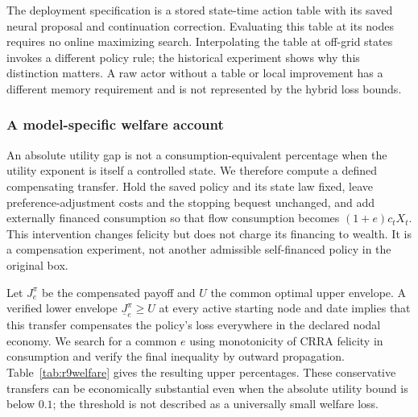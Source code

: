 \documentclass[ecta,nameyear,draft]{econsocart}
\theoremstyle{definition}
\theoremstyle{remark}
\begin{document}
The deployment specification is a stored state-time action table with its saved neural proposal and continuation correction. Evaluating this table at its nodes requires no online maximizing search. Interpolating the table at off-grid states invokes a different policy rule; the historical experiment shows why this distinction matters. A raw actor without a table or local improvement has a different memory requirement and is not represented by the hybrid loss bounds.

\subsubsection{A model-specific welfare account}
An absolute utility gap is not a consumption-equivalent percentage when the utility exponent is itself a controlled state. We therefore compute a defined compensating transfer. Hold the saved policy and its state law fixed, leave preference-adjustment costs and the stopping bequest unchanged, and add externally financed consumption so that flow consumption becomes $(1+e)c_tX_t$. This intervention changes felicity but does not charge its financing to wealth. It is a compensation experiment, not another admissible self-financed policy in the original box.

Let $J_e^\pi$ be the compensated payoff and $U$ the common optimal upper envelope. A verified lower envelope $\underline J_e^\pi\geq U$ at every active starting node and date implies that this transfer compensates the policy's loss everywhere in the declared nodal economy. We search for a common $e$ using monotonicity of CRRA felicity in consumption and verify the final inequality by outward propagation. Table~\ref{tab:r9welfare} gives the resulting upper percentages. These conservative transfers can be economically substantial even when the absolute utility bound is below $0.1$; the threshold is not described as a universally small welfare loss.
\end{document}
